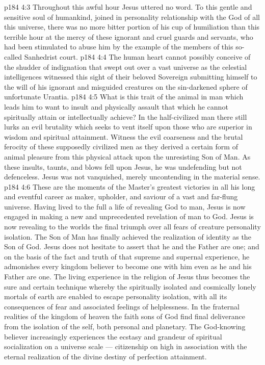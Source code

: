 \vs p184 4:3 Throughout this awful hour Jesus uttered no word. To this gentle and sensitive soul of humankind, joined in personality relationship with the God of all this universe, there was no more bitter portion of his cup of humiliation than this terrible hour at the mercy of these ignorant and cruel guards and servants, who had been stimulated to abuse him by the example of the members of this so\hyp{}called Sanhedrist court.
\vs p184 4:4 \pc The human heart cannot possibly conceive of the shudder of indignation that swept out over a vast universe as the celestial intelligences witnessed this sight of their beloved Sovereign submitting himself to the will of his ignorant and misguided creatures on the sin\hyp{}darkened sphere of unfortunate Urantia.
\vs p184 4:5 What is this trait of the animal in man which leads him to want to insult and physically assault that which he cannot spiritually attain or intellectually achieve? In the half\hyp{}civilized man there still lurks an evil brutality which seeks to vent itself upon those who are superior in wisdom and spiritual attainment. Witness the evil coarseness and the brutal ferocity of these supposedly civilized men as they derived a certain form of animal pleasure from this physical attack upon the unresisting Son of Man. As these insults, taunts, and blows fell upon Jesus, he was undefending but not defenceless. Jesus was not vanquished, merely uncontending in the material sense.
\vs p184 4:6 These are the moments of the Master’s greatest victories in all his long and eventful career as maker, upholder, and saviour of a vast and far\hyp{}flung universe. Having lived to the full a life of revealing God to man, Jesus is now engaged in making a new and unprecedented revelation of man to God. Jesus is now revealing to the worlds the final triumph over all fears of creature personality isolation. The Son of Man has finally achieved the realization of identity as the Son of God. Jesus does not hesitate to assert that he and the Father are one; and on the basis of the fact and truth of that supreme and supernal experience, he admonishes every kingdom believer to become one with him even as he and his Father are one. The living experience in the religion of Jesus thus becomes the sure and certain technique whereby the spiritually isolated and cosmically lonely mortals of earth are enabled to escape personality isolation, with all its consequences of fear and associated feelings of helplessness. In the fraternal realities of the kingdom of heaven the faith sons of God find final deliverance from the isolation of the self, both personal and planetary. The God\hyp{}knowing believer increasingly experiences the ecstasy and grandeur of spiritual socialization on a universe scale --- citizenship on high in association with the eternal realization of the divine destiny of perfection attainment.
